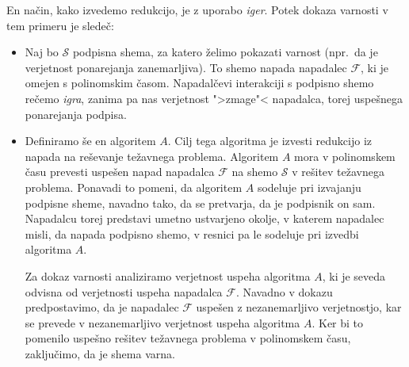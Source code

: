 En način, kako izvedemo redukcijo, je z uporabo \textit{iger}. Potek dokaza varnosti v tem primeru
je sledeč:
\begin{itemize}
    \item Naj bo $\mathcal{S}$ podpisna shema, za katero želimo pokazati varnost (npr.\ da je verjetnost
        ponarejanja zanemarljiva). To shemo napada napadalec $\mathcal{F}$, ki je omejen s
        polinomskim časom. Napadalčevi interakciji s podpisno shemo rečemo \textit{igra}, zanima
        pa nas verjetnost ">zmage"< napadalca, torej uspešnega ponarejanja podpisa.
    \item Definiramo še en algoritem $A$. Cilj tega algoritma je izvesti redukcijo
        iz napada na reševanje težavnega problema. Algoritem $A$ mora v polinomskem času
        prevesti uspešen napad napadalca $\mathcal{F}$ na shemo $\mathcal{S}$ v rešitev težavnega
        problema. Ponavadi to pomeni, da algoritem $A$ sodeluje pri izvajanju podpisne sheme,
        navadno tako, da se pretvarja, da je podpisnik on sam. Napadalcu torej predstavi umetno ustvarjeno
        okolje, v katerem napadalec misli, da napada podpisno shemo, v resnici pa le sodeluje pri
        izvedbi algoritma $A$.

        Za dokaz varnosti analiziramo verjetnost uspeha algoritma $A$, ki je seveda odvisna
        od verjetnosti uspeha napadalca $\mathcal{F}$. Navadno v dokazu predpostavimo, da je napadalec
        $\mathcal{F}$ uspešen z nezanemarljivo verjetnostjo, kar se prevede v nezanemarljivo verjetnost
        uspeha algoritma $A$. Ker bi to pomenilo uspešno rešitev težavnega problema v
        polinomskem času, zaključimo, da je shema varna.
\end{itemize}

